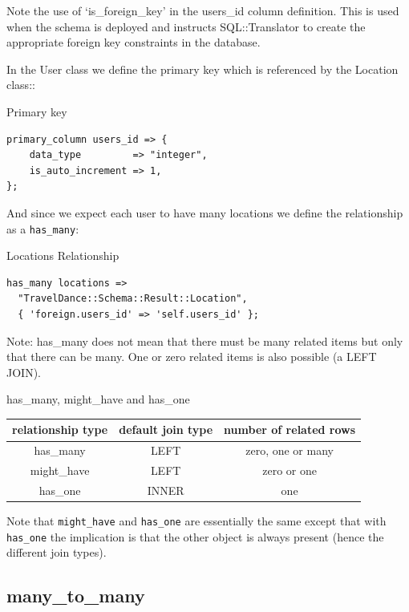 Note the use of ‘is\_foreign\_key’ in the users\_id column definition. This is used when the schema is deployed and instructs SQL::Translator to create the appropriate foreign key constraints in the database.

In the User class we define the primary key which is referenced by the Location class::

\begin{frame}[fragile]{Primary key}
\begin{lstlisting}
primary_column users_id => {
    data_type         => "integer",
    is_auto_increment => 1,
};
\end{lstlisting}
\end{frame}

And since we expect each user to have many locations we define the relationship as a \verb|has_many|:

\begin{frame}[fragile]{Locations Relationship}
\begin{lstlisting}
has_many locations =>
  "TravelDance::Schema::Result::Location",
  { 'foreign.users_id' => 'self.users_id' };
\end{lstlisting}
\end{frame}

Note: has\_many does not mean that there must be many related items but only that there can be many. One or zero related items is also possible (a LEFT JOIN).


\begin{frame}{has\_many, might\_have and has\_one}
\begin{table}
\begin{tabular}{c | c | c}
relationship type & default join type & number of related rows \\
\hline
has\_many & LEFT & zero, one or many \\
might\_have & LEFT & zero or one \\
has\_one & INNER & one
\end{tabular}
\end{table}
\end{frame}

Note that \verb|might_have| and \verb|has_one| are essentially the same
except that with \verb|has_one| the implication is that the other object is
always present (hence the different join types).

\subsection{many\_to\_many}

